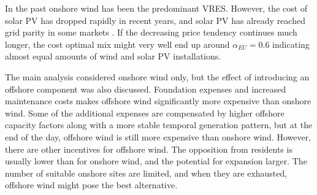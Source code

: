 \documentclass[a4paper, 5p, sort&compress]{elsarticle}%
\begin{document}
In the past onshore wind has been the predominant VRES. However, the
cost of solar PV has dropped rapidly in recent years, and solar PV has
already reached grid parity in some markets \cite{solarGridParity}. If
the decreasing price tendency continues much longer, the cost optimal
mix might very well end up around $\alpha_{EU} = 0.6$ indicating almost equal
amounts of wind and solar PV installations.




The main analysis considered onshore wind only, but the effect of
introducing an offshore component was also discussed. Foundation
expenses and increased maintenance costs makes offshore wind
significantly more expensive than onshore wind. Some of the additional
expenses are compensated by higher offshore capacity factors along
with a more stable temporal generation pattern, but at the end of the
day, offshore wind is still more expensive than onshore wind. However,
there are other incentives for offshore wind. The opposition from
residents is usually lower than for onshore wind, and the potential
for expansion larger. The number of suitable onshore sites are
limited, and when they are exhausted, offshore wind might pose the
best alternative.
\end{document}

